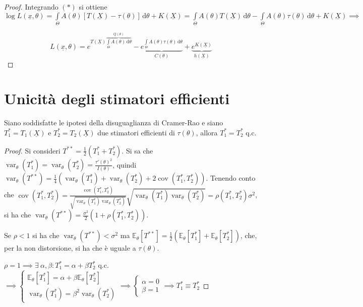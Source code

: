 \documentclass[hidelinks, 10pt]{report}
\DeclareMathOperator{\var}{var}
\DeclareMathOperator{\cov}{cov}
\begin{document}
\begin{proof}
Integrando $ (\ast) $ si ottiene $ \log L(\underline{x}, \theta) = \int\limits_{\Theta} A(\theta) [T(\underline{X}) - \tau(\theta)] \, \mathrm{d}\theta + K(\underline{X}) = \int\limits_{\Theta} A(\theta) T(\underline{X}) \, \mathrm{d}\theta - \int\limits_{\Theta} A(\theta) \tau(\theta) \, \mathrm{d}\theta + K(\underline{X}) \implies $

\[ L(\underline{x}, \theta) = e^{T(\underline{X}) \overbrace{\int\limits_{\Theta} A(\theta) \, \mathrm{d}\theta}^{Q(\theta)}} - \underbrace{e^{\int\limits_{\Theta} A(\theta) \tau(\theta) \, \mathrm{d}\theta}}_{C(\theta)} + \underbrace{e^{K(\underline{X})}}_{h(\underline{X})} \]
\end{proof}

\section{Unicit\`a degli stimatori efficienti}
\begin{prop}
Siano soddisfatte le ipotesi della disuguaglianza di Cramer-Rao e siano $ T_{1}^{\ast} = T_{1} (\underline{X}) $ e $ T_{2}^{\ast} = T_{2} (\underline{X}) $ due stimatori efficienti di $ \tau(\theta) $, allora $ T_{1}^{\ast} = T_{2}^{\ast} $ q.c.
\end{prop}

\begin{proof}
Si consideri $ T^{\ast \ast} = \frac{1}{2} (T_{1}^{\ast} + T_{2}^{\ast}) $. Si sa che $ \var_{\theta} (T_{1}^{\ast}) = \var_{\theta} (T_{2}^{\ast}) = \frac{\tau'(\theta)^2}{I(\theta)} $, quindi $ \var_{\theta} (T^{\ast\ast}) = \frac{1}{4} \left( \var_{\theta} (T_{1}^{\ast}) + \var_{\theta} (T_{2}^{\ast}) + 2 \cov(T_{1}^{\ast}, T_{2}^{\ast}) \right) $. Tenendo conto che $ \cov(T_{1}^{\ast}, T_{2}^{\ast}) = \frac{\cov(T_{1}^{\ast}, T_{2}^{\ast})}{\sqrt{\var_{\theta} (T_{1}^{\ast}) \var_{\theta} (T_{2}^{\ast})}} \sqrt{\var_{\theta} (T_{1}^{\ast}) \var_{\theta} (T_{2}^{\ast})} = \rho (T_{1}^{\ast}, T_{2}^{\ast}) \sigma^{2} $, si ha che $ \var_{\theta} (T^{\ast\ast}) = \frac{\sigma^{2}}{2} \left(1 + \rho (T_{1}^{\ast}, T_{2}^{\ast}) \right) $.

Se $ \rho < 1 $ si ha che $ \var_{\theta} (T^{\ast\ast}) < \sigma^{2} $ ma $ \mathbb{E}_{\theta} [T^{\ast \ast}] = \frac{1}{2} \left( \mathbb{E}_{\theta} [T_{1}^{\ast}] + \mathbb{E}_{\theta} [T_{2}^{\ast}] \right) $, che, per la non distorsione, si ha che \`e uguale a $ \tau(\theta) $. \Lightning

$ \rho = 1 \implies \exists\ \alpha, \beta : T_{1}^{\ast} = \alpha + \beta T_{2}^{\ast} $ q.c. $ \implies \begin{cases} \mathbb{E}_{\theta} [T_{1}^{\ast}] = \alpha + \beta \mathbb{E}_{\theta} [T_{2}^{\ast}] \\ \var_{\theta} (T_{1}^{\ast}) = \beta^2 \var_{\theta} (T_{2}^{\ast}) \end{cases} \implies \begin{cases} \alpha = 0 \\ \beta = 1 \end{cases} \implies T_{1}^{\ast} \equiv T_{2}^{\ast} $
\end{proof}
\end{document}
